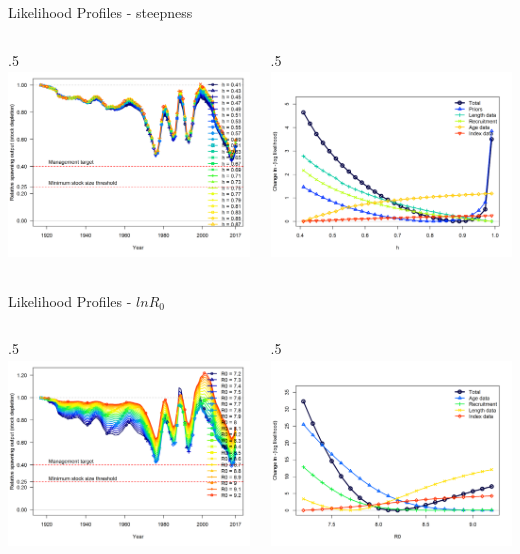 \documentclass[ignorenonframetext,]{beamer}
\def\begincols{\begin{columns}}
\def\begincol{\begin{column}}
\def\endcol{\end{column}}
\def\endcols{\end{columns}}
\begin{document}
\begin{frame}{Likelihood Profiles - steepness}

\begincols
 \begincol{.5\textwidth}
\includegraphics[height=5cm]{Figures/profile_h_depl.png} \endcol
 \begincol{.5\textwidth}
\includegraphics[height=5cm]{Figures/profile_h_like.png}\\
\endcol
\endcols

\end{frame}

\begin{frame}{Likelihood Profiles - \(lnR_0\)}

\begincols
 \begincol{.5\textwidth}
\includegraphics[height=5cm]{Figures/profile_R0_depl.png} \endcol
 \begincol{.5\textwidth}
\includegraphics[height=5cm]{Figures/profile_R0_like.png}\\
\endcol
\endcols

\end{frame}
\end{document}
